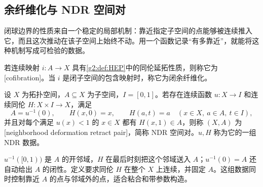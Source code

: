 \subsection{余纤维化与 NDR 空间对}
\label{g2:subsec:0102:03}
闭球边界的性质来自一个稳定的局部机制：靠近指定子空间的点能够被连续推入它，而且这次推动在该子空间上始终不动。用一个函数记录“有多靠近”，就能将这种机制写成可检验的数据。

\begin{definition}[余纤维化]\label{g2:def:cofibration}
	若连续映射 \(i:A\to X\) 具有\cref{g2:def:HEP}中的同伦延拓性质，则称它为[cofibration]。当 \(i\) 是闭子空间的包含映射时，称它为闭余纤维化。
\end{definition}

\begin{definition}\label{g2:def:NDR-pair}
	设 \(X\) 为拓扑空间，\(A\subseteq X\) 为子空间，\(I=[0,1]\)。若存在连续函数 \(u:X\to I\) 和连续同伦 \(H:X\times I\to X\)，满足
	\[
		A=u^{-1}(0),\qquad H(x,0)=x,\qquad H(a,t)=a
		\quad(x\in X,\ a\in A,\ t\in I),
	\]
	并且对每个满足 \(u(x)<1\) 的 \(x\in X\) 都有 \(H(x,1)\in A\)，则称 \((X,A)\) 为[neighborhood deformation retract pair]，简称 NDR 空间对。\(u,H\) 称为它的一组 NDR 数据。
\end{definition}

\(u^{-1}([0,1))\) 是 \(A\) 的开邻域，\(H\) 在最后时刻把这个邻域送入 \(A\)；\(u^{-1}(0)=A\) 还自动给出 \(A\) 的闭性。定义要求同伦 \(H\) 在整个 \(X\) 上连续，并固定 \(A\)。这组数据同时控制靠近 \(A\) 的点与邻域外的点，适合粘合和带参数构造。

